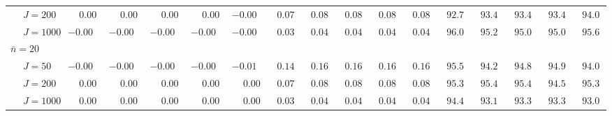 \begin{sidewaystable}
\begin{threeparttable}
\begin{tabular}{llccccccccccccccc}
 & \nopagebreak $\;J=200$  & $\phantom{-}0.00\phantom{0}$ & $\phantom{-}0.00\phantom{0}$ & $\phantom{-}0.00\phantom{0}$ & $\phantom{-}0.00\phantom{0}$ & ${-}0.00\phantom{0}$ & $\phantom{0}0.07\phantom{0}$ & $\phantom{0}0.08\phantom{0}$ & $\phantom{0}0.08\phantom{0}$ & $\phantom{0}0.08\phantom{0}$ & $\phantom{0}0.08\phantom{0}$ & $\phantom{0}92.7\phantom{0}$ & $\phantom{0}93.4\phantom{0}$ & $\phantom{0}93.4\phantom{0}$ & $\phantom{0}93.4\phantom{0}$ & $\phantom{0}94.0\phantom{0}$ \\
 & \nopagebreak $\;J=1000$  & ${-}0.00\phantom{0}$ & ${-}0.00\phantom{0}$ & ${-}0.00\phantom{0}$ & ${-}0.00\phantom{0}$ & ${-}0.00\phantom{0}$ & $\phantom{0}0.03\phantom{0}$ & $\phantom{0}0.04\phantom{0}$ & $\phantom{0}0.04\phantom{0}$ & $\phantom{0}0.04\phantom{0}$ & $\phantom{0}0.04\phantom{0}$ & $\phantom{0}96.0\phantom{0}$ & $\phantom{0}95.2\phantom{0}$ & $\phantom{0}95.0\phantom{0}$ & $\phantom{0}95.0\phantom{0}$ & $\phantom{0}95.6\phantom{0}$ \\
\multicolumn{4}{l}{$\bar{n}=20$} \\  & \nopagebreak $\;J=50$  & ${-}0.00\phantom{0}$ & ${-}0.00\phantom{0}$ & ${-}0.00\phantom{0}$ & ${-}0.00\phantom{0}$ & ${-}0.01\phantom{0}$ & $\phantom{0}0.14\phantom{0}$ & $\phantom{0}0.16\phantom{0}$ & $\phantom{0}0.16\phantom{0}$ & $\phantom{0}0.16\phantom{0}$ & $\phantom{0}0.16\phantom{0}$ & $\phantom{0}95.5\phantom{0}$ & $\phantom{0}94.2\phantom{0}$ & $\phantom{0}94.8\phantom{0}$ & $\phantom{0}94.9\phantom{0}$ & $\phantom{0}94.0\phantom{0}$ \\
 & \nopagebreak $\;J=200$  & $\phantom{-}0.00\phantom{0}$ & $\phantom{-}0.00\phantom{0}$ & $\phantom{-}0.00\phantom{0}$ & $\phantom{-}0.00\phantom{0}$ & $\phantom{-}0.00\phantom{0}$ & $\phantom{0}0.07\phantom{0}$ & $\phantom{0}0.08\phantom{0}$ & $\phantom{0}0.08\phantom{0}$ & $\phantom{0}0.08\phantom{0}$ & $\phantom{0}0.08\phantom{0}$ & $\phantom{0}95.3\phantom{0}$ & $\phantom{0}95.4\phantom{0}$ & $\phantom{0}95.4\phantom{0}$ & $\phantom{0}94.5\phantom{0}$ & $\phantom{0}95.3\phantom{0}$ \\
 & \nopagebreak $\;J=1000$  & $\phantom{-}0.00\phantom{0}$ & $\phantom{-}0.00\phantom{0}$ & $\phantom{-}0.00\phantom{0}$ & $\phantom{-}0.00\phantom{0}$ & $\phantom{-}0.00\phantom{0}$ & $\phantom{0}0.03\phantom{0}$ & $\phantom{0}0.04\phantom{0}$ & $\phantom{0}0.04\phantom{0}$ & $\phantom{0}0.04\phantom{0}$ & $\phantom{0}0.04\phantom{0}$ & $\phantom{0}94.4\phantom{0}$ & $\phantom{0}93.1\phantom{0}$ & $\phantom{0}93.3\phantom{0}$ & $\phantom{0}93.3\phantom{0}$ & $\phantom{0}93.0\phantom{0}$ \\

\end{tabular}
\end{threeparttable}
\end{sidewaystable}
